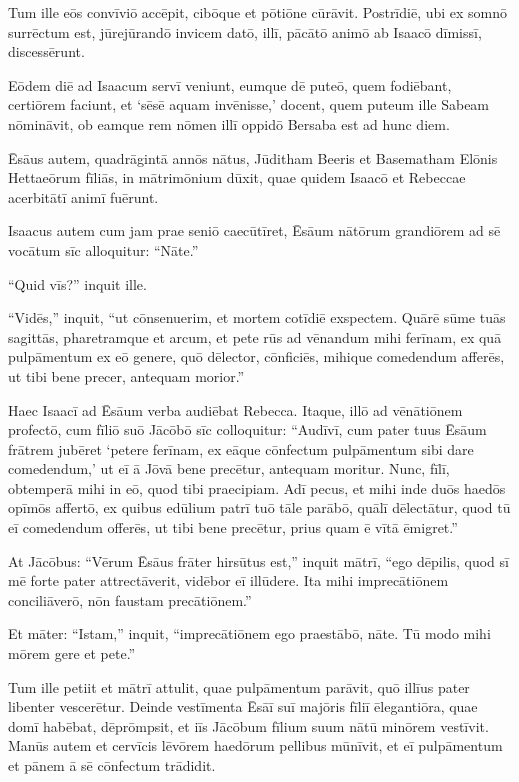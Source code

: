 \Versus Tum ille eōs convīviō accēpit, cibōque et pōtiōne cūrāvit.
\Versus Postrīdiē, ubi ex somnō surrēctum est, jūrejūrandō invicem datō, illī, pācātō animō ab Isaacō dīmissī, discessērunt.

\Versus Eōdem diē ad Isaacum servī veniunt, eumque dē puteō, quem fodiēbant, certiōrem faciunt, et `sēsē aquam invēnisse,' docent,
\Versus quem puteum ille Sabeam nōmināvit, ob eamque rem nōmen illī oppidō Bersaba est ad hunc diem.

\Versus Ēsāus autem, quadrāgintā annōs nātus, Jūditham Beeris et Basematham Elōnis Hettaeōrum fīliās, in mātrimōnium dūxit,
\Versus quae quidem Isaacō et Rebeccae acerbitātī animī fuērunt.



\Caput
\Versus Isaacus autem cum jam prae seniō caecūtīret, Ēsāum nātōrum grandiōrem ad sē vocātum sīc alloquitur: ``Nāte.''

``Quid vīs?'' inquit ille.

\Versus ``Vidēs,'' inquit, ``ut cōnsenuerim, et mortem cotīdiē exspectem.
\Versus Quārē sūme tuās sagittās, pharetramque et arcum, et pete rūs ad vēnandum mihi ferīnam,
\Versus ex quā pulpāmentum ex eō genere, quō dēlector, cōnficiēs, mihique comedendum afferēs, ut tibi bene precer, antequam morior.''

\Versus Haec Isaacī ad Ēsāum verba audiēbat Rebecca. Itaque, illō ad vēnātiōnem profectō,
\Versus cum fīliō suō Jācōbō sīc colloquitur: ``Audīvī, cum pater tuus Ēsāum frātrem jubēret `petere ferīnam,
\Versus ex eāque cōnfectum pulpāmentum sibi dare comedendum,' ut eī ā Jōvā bene precētur, antequam moritur.
\Versus Nunc, fīlī, obtemperā mihi in eō, quod tibi praecipiam.
\Versus Adī pecus, et mihi inde duōs haedōs opīmōs affertō, ex quibus edūlium patrī tuō tāle parābō, quālī dēlectātur,
\Versus quod tū eī comedendum offerēs, ut tibi bene precētur, prius quam ē vītā ēmigret.''

\Versus At Jācōbus: ``Vērum Ēsāus frāter hirsūtus est,'' inquit mātrī, ``ego dēpilis,
\Versus quod sī mē forte pater attrectāverit, vidēbor eī illūdere. Ita mihi imprecātiōnem conciliāverō, nōn faustam precātiōnem.''

\Versus Et māter: ``Istam,'' inquit, ``imprecātiōnem ego praestābō, nāte. Tū modo mihi mōrem gere et pete.''

\Versus Tum ille petiit et mātrī attulit, quae pulpāmentum parāvit, quō illīus pater libenter vescerētur.
\Versus Deinde vestīmenta Ēsāī suī majōris fīliī ēlegantiōra, quae domī habēbat, dēprōmpsit, et iīs Jācōbum fīlium suum nātū minōrem vestīvit.
\Versus Manūs autem et cervīcis lēvōrem haedōrum pellibus mūnīvit,
\Versus et eī pulpāmentum et pānem ā sē cōnfectum trādidit.

